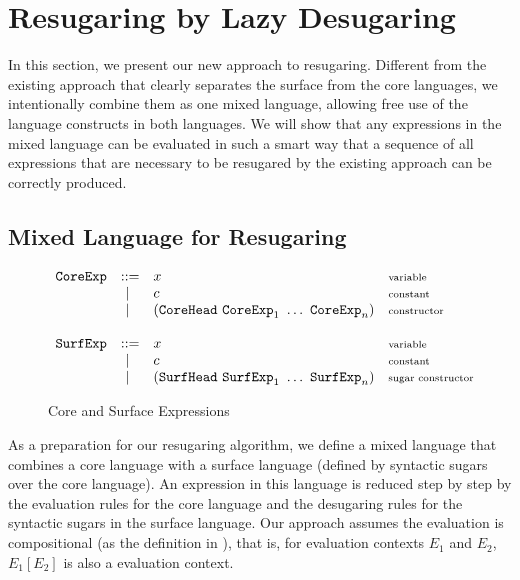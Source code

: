 
\section{Resugaring by Lazy Desugaring}
\label{sec3}

In this section, we present our new approach to resugaring. Different from the existing approach that clearly separates the surface from the core languages, we intentionally combine them as one mixed language, allowing free use of the language constructs in both languages. We will show that any expressions in the mixed language can be evaluated in such a smart way that a sequence of all expressions that are necessary to be resugared by the existing approach can be correctly produced.

\subsection{Mixed Language for Resugaring}

\begin{figure}[t]
\begin{flushleft}
{\footnotesize
\[
\begin{array}{lllll}
\mbox{\tt CoreExp} &::=& x  & \mbox{{\scriptsize variable}}\\
&~|~& c  & \mbox{{\scriptsize constant}}\\
&~|~& (\mbox{\tt CoreHead}~\mbox{\tt CoreExp}_1~\ldots~\mbox{\tt CoreExp}_n) & \mbox{{\scriptsize constructor}}\\
\\
\mbox{\tt SurfExp} &::=& x  & \mbox{{\scriptsize variable}}\\
&~|~& c  & \mbox{{\scriptsize constant}}\\
&~|~& (\mbox{\tt SurfHead}~\mbox{\tt SurfExp}_1~\ldots~\mbox{\tt SurfExp}_n) & \mbox{{\scriptsize sugar constructor}}\\
\end{array}
\]
}
\end{flushleft}


	\caption{Core and Surface Expressions}
	\label{fig:expression}
\end{figure}

As a preparation for our resugaring algorithm, we define a mixed language that combines a core language with a surface language (defined by syntactic sugars over the core language). An expression in this language is reduced step by step by the evaluation rules for the core language and the desugaring rules for the syntactic sugars in the surface language. Our approach assumes the evaluation is  compositional (as the definition in \cite{hygienic}), that is, for evaluation contexts $E_1$ and $E_2$, $E_1[E_2]$ is also a evaluation context.
